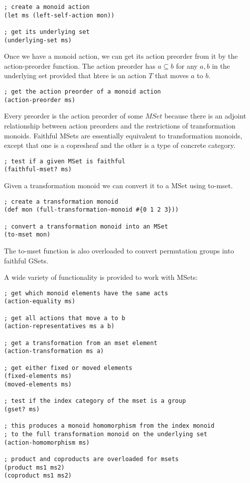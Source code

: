 \documentclass[a4paper,11pt]{report}
\begin{document}
\lstset {language=Lisp}
\begin{lstlisting}
; create a monoid action
(let ms (left-self-action mon))

; get its underlying set 
(underlying-set ms)
\end{lstlisting}

Once we have a monoid action, we can get its action preorder from it by the action-preorder function. The action preorder has $a \subseteq b$ for any $a,b$ in the underlying set provided that htere is an action $T$ that moves $a$ to $b$.

\lstset {language=Lisp}
\begin{lstlisting}
; get the action preorder of a monoid action
(action-preorder ms)
\end{lstlisting}

Every preorder is the action preorder of some $MSet$ because there is an adjoint relationship between action preorders and the restrictions of transformation monoids. Faithful MSets are essentially equivalent to transformation monoids, except that one is a copresheaf and the other is a type of concrete category.

\lstset {language=Lisp}
\begin{lstlisting}
; test if a given MSet is faithful
(faithful-mset? ms)
\end{lstlisting}

Given a transformation monoid we can convert it to a MSet using to-mset.

\lstset {language=Lisp}
\begin{lstlisting}
; create a transformation monoid
(def mon (full-transformation-monoid #{0 1 2 3}))

; convert a transformation monoid into an MSet
(to-mset mon)
\end{lstlisting}

The to-mset function is also overloaded to convert permutation groups into faithful GSets.
\newpage 

A wide variety of functionality is provided to work with MSets:

\lstset {language=Lisp}
\begin{lstlisting}
; get which monoid elements have the same acts
(action-equality ms)

; get all actions that move a to b
(action-representatives ms a b)

; get a transformation from an mset element
(action-transformation ms a)

; get either fixed or moved elements
(fixed-elements ms)
(moved-elements ms)

; test if the index category of the mset is a group
(gset? ms)

; this produces a monoid homomorphism from the index monoid
; to the full transformation monoid on the underlying set
(action-homomorphism ms)

; product and coproducts are overloaded for msets
(product ms1 ms2)
(coproduct ms1 ms2)
\end{lstlisting}
\end{document}
